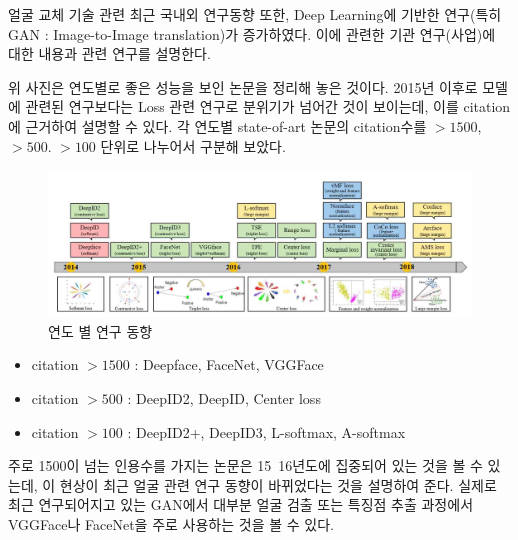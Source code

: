 \documentclass[chapter,oneside]{oblivoir}
\begin{document}
얼굴 교체 기술 관련 최근 국내외 연구동향 또한, Deep Learning에 기반한 연구(특히 GAN : Image-to-Image translation)가 증가하였다. 이에 관련한 기관 연구(사업)에 대한 내용과 관련 연구를 설명한다.


위 사진은 연도별로 좋은 성능을 보인 논문을 정리해 놓은 것이다. 2015년 이후로 모델에 관련된 연구보다는 Loss 관련 연구로 분위기가 넘어간 것이 보이는데, 이를 citation에 근거하여 설명할 수 있다. 각 연도별 state-of-art 논문의 citation수를 $>1500$, $> 500$. $> 100$ 단위로 나누어서 구분해 보았다. 

\begin{figure}[h!]
  \centering
    \includegraphics[scale = 0.7]{pic/chp1/img594}
  \caption{연도 별 연구 동향 \cite{reference6}}
\end{figure}

\begin{itemize}
\item   citation $> 1500$ : Deepface, FaceNet, VGGFace
\item   citation $> 500$  : DeepID2, DeepID, Center loss
\item   citation $> 100$  : DeepID2+, DeepID3, L-softmax, A-softmax
\end{itemize}

주로 1500이 넘는 인용수를 가지는 논문은 15~16년도에 집중되어 있는 것을 볼 수 있는데, 이 현상이 최근 얼굴 관련 연구 동향이 바뀌었다는 것을 설명하여 준다. 실제로 최근 연구되어지고 있는 GAN에서 대부분 얼굴 검출 또는 특징점 추출 과정에서 VGGFace나 FaceNet을 주로 사용하는 것을 볼 수 있다. 
\end{document}
